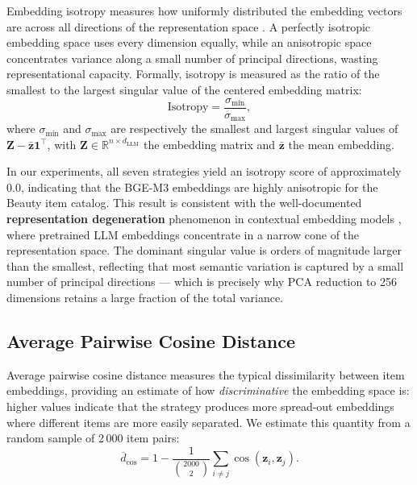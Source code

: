\documentclass[12pt,a4paper]{report}
\newcommand{\parencite}[1]{\citep{#1}}
\begin{document}
Embedding isotropy measures how uniformly distributed the
embedding vectors are across all directions of the
representation space \parencite{mu2018allbutthetop}. A
perfectly isotropic embedding space uses every dimension
equally, while an anisotropic space concentrates variance
along a small number of principal directions, wasting
representational capacity. Formally, isotropy is measured
as the ratio of the smallest to the largest singular value
of the centered embedding matrix:
\begin{equation}
  \text{Isotropy} = \frac{\sigma_{\min}}{\sigma_{\max}},
\end{equation}
where $\sigma_{\min}$ and $\sigma_{\max}$ are respectively
the smallest and largest singular values of
$\mathbf{Z} - \bar{\mathbf{z}}\mathbf{1}^\top$, with
$\mathbf{Z} \in \mathbb{R}^{n \times d_{\text{LLM}}}$ the
embedding matrix and $\bar{\mathbf{z}}$ the mean embedding.

In our experiments, all seven strategies yield an isotropy
score of approximately 0.0, indicating that the BGE-M3
embeddings are highly anisotropic for the Beauty item catalog.
This result is consistent with the well-documented
\textbf{representation degeneration} phenomenon in contextual
embedding models \parencite{li2020sentence, mu2018allbutthetop},
where pretrained LLM embeddings concentrate in a narrow
cone of the representation space. The dominant singular value
is orders of magnitude larger than the smallest, reflecting
that most semantic variation is captured by a small number
of principal directions --- which is precisely why PCA
reduction to 256 dimensions retains a large fraction of
the total variance.

\subsection{Average Pairwise Cosine Distance}

Average pairwise cosine distance measures the typical
dissimilarity between item embeddings, providing an estimate
of how \textit{discriminative} the embedding space is:
higher values indicate that the strategy produces more
spread-out embeddings where different items are more
easily separated. We estimate this quantity from a random
sample of 2\,000 item pairs:
\begin{equation}
  \overline{d}_{\cos} =
    1 - \frac{1}{\binom{2000}{2}}
    \sum_{i \neq j} \cos(\mathbf{z}_i, \mathbf{z}_j).
\end{equation}
\end{document}
